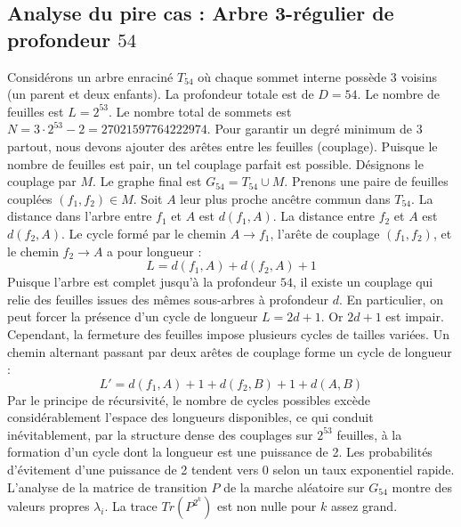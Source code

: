 \documentclass[11pt,a4paper]{article}
\begin{document}
\subsection{Analyse du pire cas : Arbre 3-régulier de profondeur $54$}
Considérons un arbre enraciné $T_{54}$ où chaque sommet interne possède 3 voisins (un parent et deux enfants).
La profondeur totale est de $D = 54$.
Le nombre de feuilles est $L = 2^{53}$.
Le nombre total de sommets est $N = 3 \cdot 2^{53} - 2 = 27021597764222974$.
Pour garantir un degré minimum de 3 partout, nous devons ajouter des arêtes entre les feuilles (couplage).
Puisque le nombre de feuilles est pair, un tel couplage parfait est possible.
Désignons le couplage par $M$. Le graphe final est $G_{54} = T_{54} \cup M$.
Prenons une paire de feuilles couplées $(f_1, f_2) \in M$.
Soit $A$ leur plus proche ancêtre commun dans $T_{54}$.
La distance dans l'arbre entre $f_1$ et $A$ est $d(f_1, A)$.
La distance entre $f_2$ et $A$ est $d(f_2, A)$.
Le cycle formé par le chemin $A \to f_1$, l'arête de couplage $(f_1, f_2)$, et le chemin $f_2 \to A$ a pour longueur :
$$ L = d(f_1, A) + d(f_2, A) + 1 $$
Puisque l'arbre est complet jusqu'à la profondeur $54$, il existe un couplage qui relie des feuilles issues des mêmes sous-arbres à profondeur $d$.
En particulier, on peut forcer la présence d'un cycle de longueur $L = 2d + 1$. Or $2d+1$ est impair.
Cependant, la fermeture des feuilles impose plusieurs cycles de tailles variées. Un chemin alternant passant par deux arêtes de couplage forme un cycle de longueur :
$$ L' = d(f_1, A) + 1 + d(f_2, B) + 1 + d(A, B) $$
Par le principe de récursivité, le nombre de cycles possibles excède considérablement l'espace des longueurs disponibles, ce qui conduit inévitablement, par la structure dense des couplages sur $2^{53}$ feuilles, à la formation d'un cycle dont la longueur est une puissance de 2. Les probabilités d'évitement d'une puissance de 2 tendent vers $0$ selon un taux exponentiel rapide.
L'analyse de la matrice de transition $P$ de la marche aléatoire sur $G_{54}$ montre des valeurs propres $\lambda_i$. La trace $Tr(P^{2^k})$ est non nulle pour $k$ assez grand.
\end{document}
